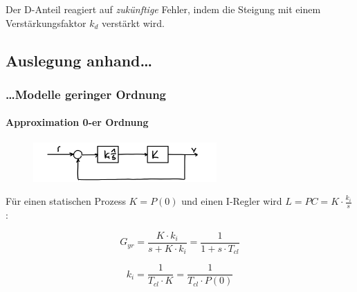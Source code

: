 \documentclass[
  10pt,
  a4paper,
  twocolumn]{article}
\let\oldparagraph\paragraph
\renewcommand{\paragraph}[1]{\oldparagraph{#1}\mbox{}}
\numberwithin{equation}{section}
\let\paragraph\oldparagraph
\renewcommand{\paragraph}[1]{\oldparagraph{#1}\mbox{}\par}
\begin{document}
Der D-Anteil reagiert auf \emph{zukünftige} Fehler, indem die Steigung
mit einem Verstärkungsfaktor \(k_d\) verstärkt wird.

\newpage

\hypertarget{auslegung-anhand}{%
\subsection{Auslegung anhand\ldots{}}\label{auslegung-anhand}}

\hypertarget{modelle-geringer-ordnung}{%
\subsubsection{\ldots Modelle geringer
Ordnung}\label{modelle-geringer-ordnung}}

\hypertarget{approximation-0-er-ordnung}{%
\paragraph{Approximation 0-er
Ordnung}\label{approximation-0-er-ordnung}}

\begin{figure}[H]

{\centering \includegraphics[width=7cm,height=\textheight]{images/paste-31.png}

}

\end{figure}

Für einen statischen Prozess \(K=P(0)\) und einen I-Regler wird
\(L=PC=K\cdot\frac{k_i}{s}\):

\[
G_{yr}=\frac{K\cdot k_i}{s+K\cdot k_i}=\frac1{1+s\cdot T_{cl}}
\]

\[
k_i = \frac{1}{T_{cl}\cdot K}=\frac1{T_{cl}\cdot P(0)}
\]
\end{document}
